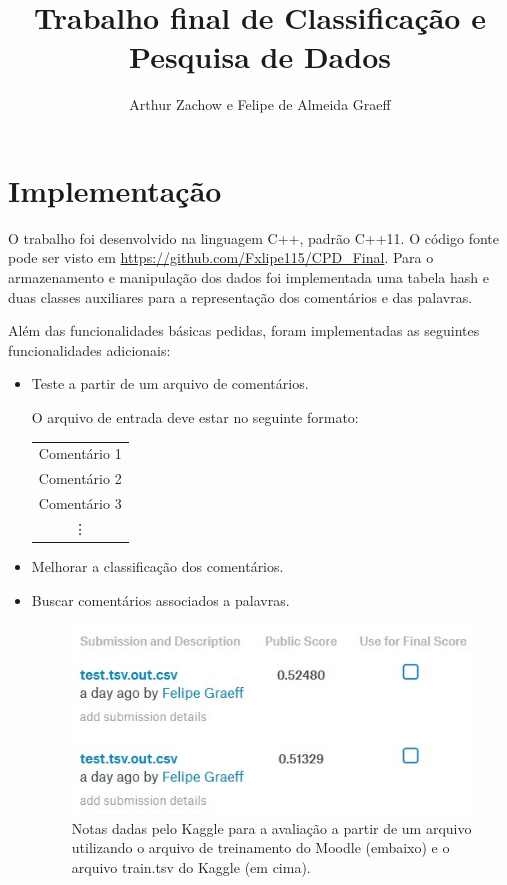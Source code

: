 \documentclass[12pt]{article}
\title{Trabalho final de Classificação e Pesquisa de Dados}
\author{Arthur Zachow\inst{1} e Felipe de Almeida Graeff\inst{1}}
\begin{document}
\maketitle

\section{Implementação}
O trabalho foi desenvolvido na linguagem C++, padrão C++11. O código fonte pode ser visto em 
\url{https://github.com/Fxlipe115/CPD_Final}. Para o armazenamento e manipulação dos dados foi 
implementada uma tabela hash e duas classes auxiliares para a representação dos comentários e das 
palavras.

Além das funcionalidades básicas pedidas, foram implementadas as seguintes funcionalidades adicionais:

\begin{itemize}
\item Teste a partir de um arquivo de comentários.

  O arquivo de entrada deve estar no seguinte formato:
  \begin{table}[ht]
  \centering
  \begin{tabular}{|c|}
  \hline
  Comentário 1\\[0.5ex]
  Comentário 2\\[0.5ex]
  Comentário 3\\[0.5ex]
  \vdots\\[0.5ex]
  \hline
  \end{tabular}
  \end{table}

\item Melhorar a classificação dos comentários.
   
\item Buscar comentários associados a palavras.

\begin{figure}[ht]
\centering
\includegraphics[width=.5\textwidth]{kaggle.jpg}
\caption{Notas dadas pelo Kaggle para a avaliação a partir de um arquivo utilizando o arquivo de 
  treinamento do Moodle (embaixo) e o arquivo train.tsv do Kaggle (em cima).}
\label{fig:kaggle}
\end{figure}
  
  
\end{itemize}
\end{document}
